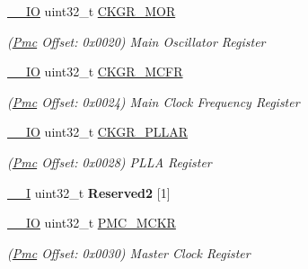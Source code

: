 \begin{DoxyCompactItemize}
\mbox{\label{structPmc_ac354cb723613e2a19901c9a74d249d3b}} 
\mbox{\hyperlink{core__cm7_8h_aec43007d9998a0a0e01faede4133d6be}{\+\_\+\+\_\+\+IO}} uint32\+\_\+t \mbox{\hyperlink{structPmc_ac354cb723613e2a19901c9a74d249d3b}{C\+K\+G\+R\+\_\+\+M\+OR}}
\begin{DoxyCompactList}\small\item\em (\mbox{\hyperlink{structPmc}{Pmc}} Offset\+: 0x0020) Main Oscillator Register \end{DoxyCompactList}\item 
\mbox{\label{structPmc_a59a27f8ca82088ebd50cc67da2d7aafc}} 
\mbox{\hyperlink{core__cm7_8h_aec43007d9998a0a0e01faede4133d6be}{\+\_\+\+\_\+\+IO}} uint32\+\_\+t \mbox{\hyperlink{structPmc_a59a27f8ca82088ebd50cc67da2d7aafc}{C\+K\+G\+R\+\_\+\+M\+C\+FR}}
\begin{DoxyCompactList}\small\item\em (\mbox{\hyperlink{structPmc}{Pmc}} Offset\+: 0x0024) Main Clock Frequency Register \end{DoxyCompactList}\item 
\mbox{\label{structPmc_a004d6f5d9b46b1dcfd19577f032fc46f}} 
\mbox{\hyperlink{core__cm7_8h_aec43007d9998a0a0e01faede4133d6be}{\+\_\+\+\_\+\+IO}} uint32\+\_\+t \mbox{\hyperlink{structPmc_a004d6f5d9b46b1dcfd19577f032fc46f}{C\+K\+G\+R\+\_\+\+P\+L\+L\+AR}}
\begin{DoxyCompactList}\small\item\em (\mbox{\hyperlink{structPmc}{Pmc}} Offset\+: 0x0028) P\+L\+LA Register \end{DoxyCompactList}\item 
\mbox{\label{structPmc_a625c47ad6952a4ce4e373f20df1ad76c}} 
\mbox{\hyperlink{core__cm7_8h_af63697ed9952cc71e1225efe205f6cd3}{\+\_\+\+\_\+I}} uint32\+\_\+t {\bfseries Reserved2} \mbox{[}1\mbox{]}
\item 
\mbox{\label{structPmc_a539f8f6eb00ea275f764038b76e8db06}} 
\mbox{\hyperlink{core__cm7_8h_aec43007d9998a0a0e01faede4133d6be}{\+\_\+\+\_\+\+IO}} uint32\+\_\+t \mbox{\hyperlink{structPmc_a539f8f6eb00ea275f764038b76e8db06}{P\+M\+C\+\_\+\+M\+C\+KR}}
\begin{DoxyCompactList}\small\item\em (\mbox{\hyperlink{structPmc}{Pmc}} Offset\+: 0x0030) Master Clock Register \end{DoxyCompactList}\item 

\end{DoxyCompactItemize}
